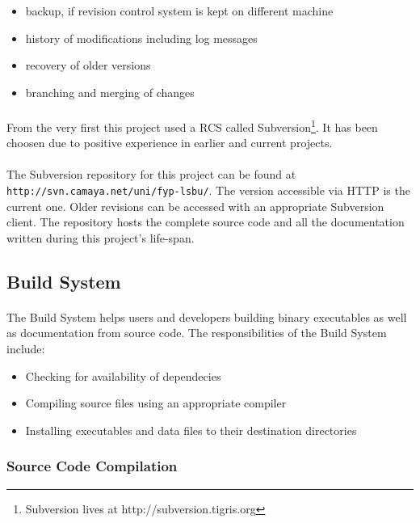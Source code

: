 \begin{itemize}
\item backup, if revision control system is kept on different machine
\item history of modifications including log messages
\item recovery of older versions
\item branching and merging of changes
\end{itemize}

\paragraph{}
From the very first this project used a RCS called Subversion\footnote{Subversion lives at http://subversion.tigris.org}. It has been choosen due to positive experience in earlier and current projects.

\paragraph{}
The Subversion repository for this project can be found at \texttt{http://svn.camaya.net/uni/fyp-lsbu/}. The version accessible via HTTP is the current one. Older revisions can be accessed with an appropriate Subversion client. The repository hosts the complete source code and all the documentation written during this project's life-span.


\subsection{Build System}
\paragraph{}
The Build System helps users and developers building binary executables as well as documentation from source code. The responsibilities of the Build System include:

\begin{itemize}
\item Checking for availability of dependecies
\item Compiling source files using an appropriate compiler
\item Installing executables and data files to their destination directories
\end{itemize}

\subsubsection{Source Code Compilation}
